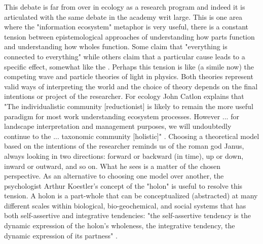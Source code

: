 This debate is far from over in ecology as a research program and indeed it is articulated with the same debate in the academy writ large. This is one area where the "information ecosystem" metaphor is very useful, there is a constant tension between epistemological approaches of understanding how  parts function and understanding how wholes function. Some claim that "everything is connected to everything" while others claim that a particular cause leads to a specific effect, somewhat like the . Perhaps this tension is like (a simile now) the competing wave and particle theories of light in physics. Both theories represent valid ways of interpreting the world and the choice of theory depends on the final intentions or project of the researcher. For ecology John Catlon explains that "The individualistic community [reductionist] is likely to remain the more useful paradigm for most work understanding ecosystem processes. However ... for landscape interpretation and management purposes, we will undoubtedly continue to the ... taxonomic community [holistic]" \cite[Cantlon 1996, cited in ][p. 241]{barbour_1996}. Choosing a theoretical model based on the intentions of the researcher reminds us of the roman god Janus, always looking in two directions: forward or backward (in time), up or down, inward or outward, and so on. What he sees is a matter of the chosen perspective. As an alternative to choosing one model over another, the psychologist Arthur Koestler's concept of the "holon" is useful to resolve this tension. A holon is a part-whole that can be conceptualized (abstracted) at many different scales within biological, bio-geochemical, and social systems that has both self-assertive and integrative tendencies: "the self-assertive tendency is the dynamic expression of the holon's wholeness, the integrative tendency, the dynamic expression of its partness" \cite[][p. 56] {koestler_1967}.

